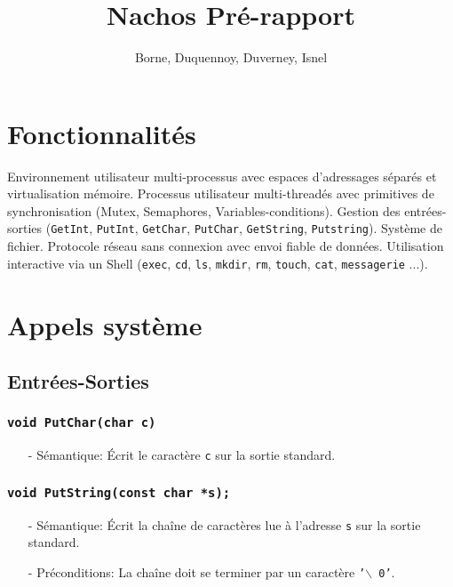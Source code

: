 \documentclass[11pt]{article}
\author{Borne, Duquennoy, Duverney, Isnel}
\date{}
\title{Nachos Pré-rapport}
\theoremstyle{definition}
\theoremstyle{definition}
\begin{document}
\maketitle



\section{Fonctionnalités}
Environnement utilisateur multi-processus avec espaces d'adressages séparés et virtualisation mémoire.
Processus utilisateur multi-threadés avec primitives de synchronisation (Mutex, Semaphores, Variables-conditions). Gestion des entrées-sorties (\texttt{GetInt}, \texttt{PutInt}, \texttt{GetChar}, \texttt{PutChar}, \texttt{GetString}, \texttt{Putstring}).
Système de fichier. Protocole réseau sans connexion avec envoi fiable de données.
Utilisation interactive via un Shell (\texttt{exec}, \texttt{cd}, \texttt{ls}, \texttt{mkdir}, \texttt{rm},
\texttt{touch}, \texttt{cat}, \texttt{messagerie} ...).


\section{Appels système}
\subsection{Entrées-Sorties}

\subsubsection{\texttt{void PutChar(char c)}}
\begin{itemize}
\item[-] Sémantique: Écrit le caractère \texttt{c} sur la sortie standard.
\end{itemize}

\subsubsection{\texttt{void PutString(const char *s);}}
\begin{itemize}
\item[-] Sémantique: Écrit la chaîne de caractères lue à l'adresse \texttt{s} sur la sortie standard.
\item[-] Préconditions: La chaîne doit se terminer par un caractère \texttt{'$\backslash$ 0'}.
\end{itemize}
\end{document}
